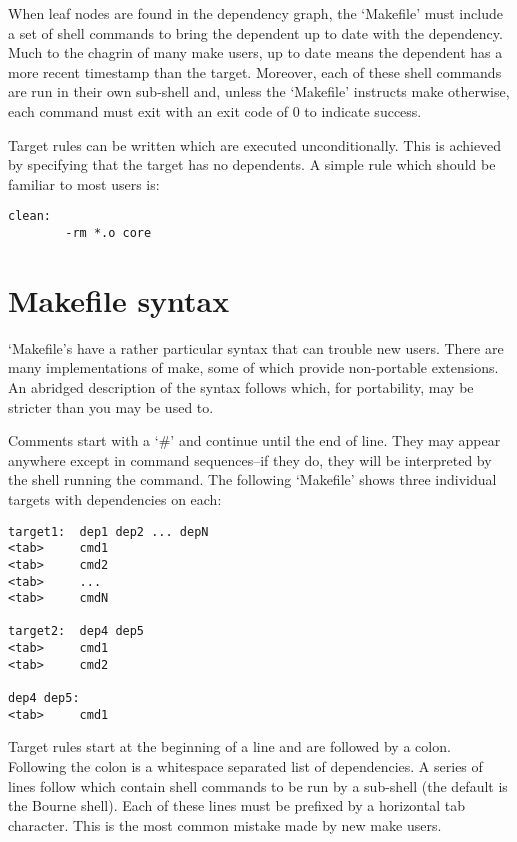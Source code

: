 When leaf nodes are found in the dependency graph, the `Makefile' must include a set of shell commands to bring the dependent up to date with the dependency. Much to the chagrin of many make users, up to date means the dependent has a more recent timestamp than the target. Moreover, each of these shell commands are run in their own sub-shell and, unless the `Makefile' instructs make otherwise, each command must exit with an exit code of 0 to indicate success. 


Target rules can be written which are executed unconditionally. This is achieved by specifying that the target has no dependents. A simple rule which should be familiar to most users is: 



\bigskip
\begin{Verbatim}[frame=single]
clean:
        -rm *.o core
\end{Verbatim}



\section{Makefile syntax}


`Makefile's have a rather particular syntax that can trouble new users. There are many implementations of make, some of which provide non-portable extensions. An abridged description of the syntax follows which, for portability, may be stricter than you may be used to. 


Comments start with a `\#' and continue until the end of line. They may appear anywhere except in command sequences--if they do, they will be interpreted by the shell running the command. The following `Makefile' shows three individual targets with dependencies on each: 



 

\bigskip
\begin{Verbatim}[frame=single]
target1:  dep1 dep2 ... depN
<tab>     cmd1
<tab>     cmd2
<tab>     ...
<tab>     cmdN

target2:  dep4 dep5
<tab>     cmd1
<tab>     cmd2

dep4 dep5:
<tab>     cmd1
\end{Verbatim}



 Target rules start at the beginning of a line and are followed by a colon. Following the colon is a whitespace separated list of dependencies. A series of lines follow which contain shell commands to be run by a sub-shell (the default is the Bourne shell). Each of these lines must be prefixed by a horizontal tab character. This is the most common mistake made by new make users. 


